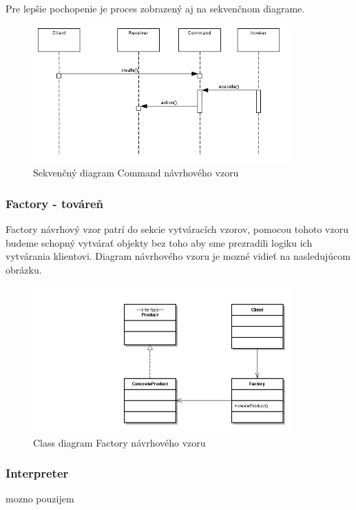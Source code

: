 Pre lepšie pochopenie je proces zobrazený aj na sekvenčnom diagrame.
\begin{figure}[!htbp]
	\centering
	\includegraphics[width=10cm]{img/command_seq.jpg}
	\caption{Sekvenčný diagram Command návrhového vzoru}
	\label{fig:test}
\end{figure}
\newline

\subsubsection{Factory - továreň}
\indent Factory návrhový vzor patrí do sekcie vytváracích vzorov, pomocou tohoto vzoru budeme schopný vytvárať objekty bez toho aby sme prezradili logiku ich vytvárania klientovi.
Diagram návrhového vzoru je mozné vidieť na nasledujúcom obrázku.
\begin{figure}[!htbp]
	\centering
	\includegraphics[width=10cm]{img/factory_design_pattern.jpg}
	\caption{Class diagram Factory návrhového vzoru}
	\label{fig:test}
\end{figure}
\newline

\subsubsection{Interpreter}
mozno pouzijem
